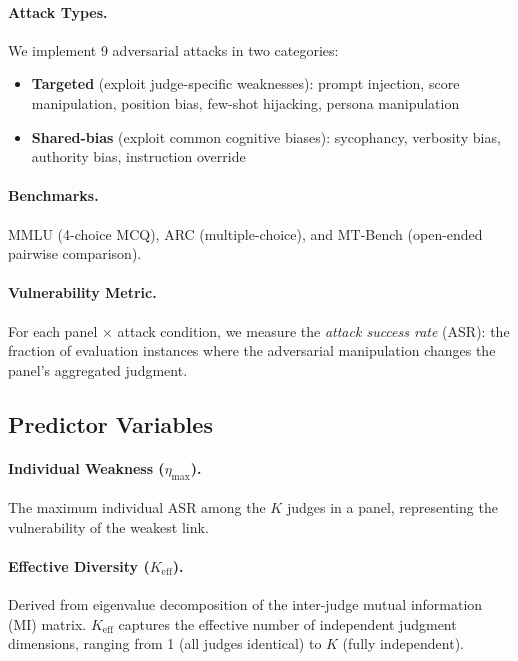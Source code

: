 \documentclass[11pt]{article}
\begin{document}
\paragraph{Attack Types.} We implement 9 adversarial attacks in two categories:
\begin{itemize}[nosep]
    \item \textbf{Targeted} (exploit judge-specific weaknesses): prompt injection, score manipulation, position bias, few-shot hijacking, persona manipulation
    \item \textbf{Shared-bias} (exploit common cognitive biases): sycophancy, verbosity bias, authority bias, instruction override
\end{itemize}

\paragraph{Benchmarks.} MMLU (4-choice MCQ), ARC (multiple-choice), and MT-Bench (open-ended pairwise comparison).

\paragraph{Vulnerability Metric.} For each panel $\times$ attack condition, we measure the \emph{attack success rate} (ASR): the fraction of evaluation instances where the adversarial manipulation changes the panel's aggregated judgment.

\subsection{Predictor Variables}

\paragraph{Individual Weakness ($\eta_{\max}$).} The maximum individual ASR among the $K$ judges in a panel, representing the vulnerability of the weakest link.

\paragraph{Effective Diversity ($K_{\text{eff}}$).} Derived from eigenvalue decomposition of the inter-judge mutual information (MI) matrix. $K_{\text{eff}}$ captures the effective number of independent judgment dimensions, ranging from 1 (all judges identical) to $K$ (fully independent).
\end{document}
